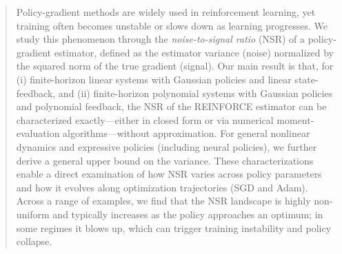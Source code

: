 
\begin{abstract}
    Policy-gradient methods are widely used in reinforcement learning, yet training often becomes unstable or slows down as learning progresses. We study this phenomenon through the \emph{noise-to-signal ratio} (NSR) of a policy-gradient estimator, defined as the estimator variance (noise) normalized by the squared norm of the true gradient (signal). Our main result is that, for (i) finite-horizon linear systems with Gaussian policies and linear state-feedback, and (ii) finite-horizon polynomial systems with Gaussian policies and polynomial feedback, the NSR of the REINFORCE estimator can be characterized exactly—either in closed form or via numerical moment-evaluation algorithms—without approximation. For general nonlinear dynamics and expressive policies (including neural policies), we further derive a general upper bound on the variance. These characterizations enable a direct examination of how NSR varies across policy parameters and how it evolves along optimization trajectories (\eg SGD and Adam). Across a range of examples, we find that the NSR landscape is highly non-uniform and typically increases as the policy approaches an optimum; in some regimes it blows up, which can trigger training instability and policy collapse.
\end{abstract}
